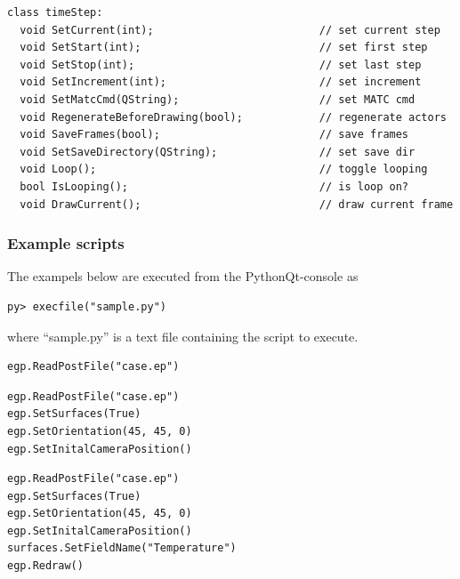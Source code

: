 \documentclass[a4paper,12pt]{article}
\begin{document}
\begin{footnotesize}
\begin{verbatim}
class timeStep:
  void SetCurrent(int);                          // set current step
  void SetStart(int);                            // set first step
  void SetStop(int);                             // set last step
  void SetIncrement(int);                        // set increment
  void SetMatcCmd(QString);                      // set MATC cmd
  void RegenerateBeforeDrawing(bool);            // regenerate actors
  void SaveFrames(bool);                         // save frames
  void SetSaveDirectory(QString);                // set save dir
  void Loop();                                   // toggle looping
  bool IsLooping();                              // is loop on?
  void DrawCurrent();                            // draw current frame
\end{verbatim}
\end{footnotesize}

\subsubsection{Example scripts}

The exampels below are executed from the PythonQt-console as
\begin{footnotesize}
\begin{verbatim}
py> execfile("sample.py")
\end{verbatim}
\end{footnotesize}
where ``sample.py'' is a text file containing the script to execute.

\vskip5mm
\begin{footnotesize}
\begin{verbatim}
egp.ReadPostFile("case.ep")
\end{verbatim}
\end{footnotesize}

\vskip5mm
\begin{footnotesize}
\begin{verbatim}
egp.ReadPostFile("case.ep")
egp.SetSurfaces(True)
egp.SetOrientation(45, 45, 0)
egp.SetInitalCameraPosition()
\end{verbatim}
\end{footnotesize}

\vskip5mm
\begin{footnotesize}
\begin{verbatim}
egp.ReadPostFile("case.ep")
egp.SetSurfaces(True)
egp.SetOrientation(45, 45, 0)
egp.SetInitalCameraPosition()
surfaces.SetFieldName("Temperature")
egp.Redraw()
\end{verbatim}
\end{footnotesize}
\end{document}
